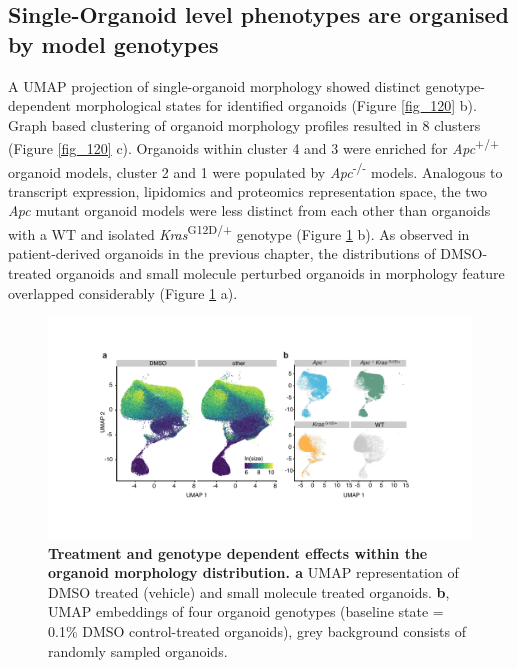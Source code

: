 \begin{flushleft}
\clearpage
\subsection{Single-Organoid level phenotypes are organised by model genotypes}
A UMAP projection of single-organoid morphology showed distinct genotype-dependent morphological states for identified organoids (Figure \ref{fig_120} b). Graph based clustering of organoid morphology profiles resulted in 8 clusters (Figure \ref{fig_120} c). Organoids within cluster 4 and 3 were enriched for \textit{Apc}\textsuperscript{+/+} organoid models, cluster 2 and 1 were populated by \textit{Apc}\textsuperscript{-/-}  models. Analogous to transcript expression, lipidomics and proteomics representation space, the two \textit{Apc} mutant organoid models were less distinct from each other than organoids with a WT and isolated \textit{Kras}\textsuperscript{G12D/+} genotype (Figure \ref{fig_140} b).  As observed in patient-derived organoids in the previous chapter, the distributions of DMSO-treated organoids and small molecule perturbed organoids in morphology feature overlapped considerably (Figure \ref{fig_140} a). 

\bigbreak
\begin{figure}[h!]
\centering
\includegraphics[width=\textwidth,
                height=\textheight,
                keepaspectratio]{figures/adenomaprofiling/pdf/fig_1_4.pdf}
\caption[Treatment and genotype dependent effects within the organoid morphology distribution]{\textbf{Treatment and genotype dependent effects within the organoid morphology distribution. a} UMAP representation of DMSO treated (vehicle) and small molecule treated organoids. \textbf{b}, UMAP embeddings of four organoid genotypes (baseline state = 0.1\% DMSO control-treated organoids), grey background consists of randomly sampled organoids.}
\label{fig_140}
\end{figure}


\end{flushleft}
